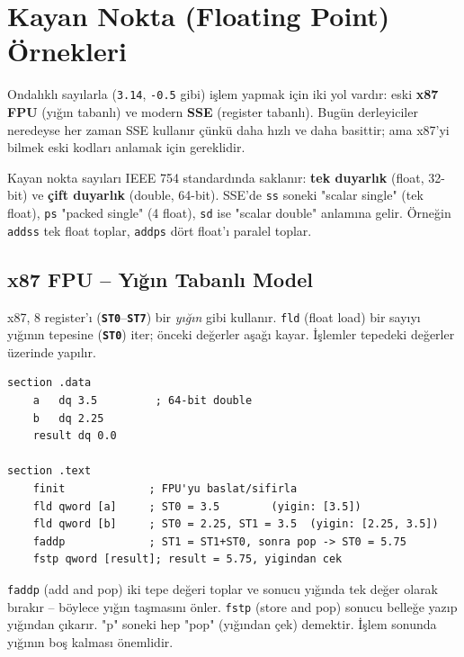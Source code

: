 \documentclass[11pt,a4paper]{article}
\newcommand{\reg}[1]{\texttt{\color{anaMavi}\textbf{#1}}}
\newcommand{\kod}[1]{\texttt{\color{koyuGri}#1}}
\begin{document}
\section{Kayan Nokta (Floating Point) Örnekleri}

Ondalıklı sayılarla (\kod{3.14}, \kod{-0.5} gibi) işlem yapmak için iki yol
vardır: eski \textbf{x87 FPU} (yığın tabanlı) ve modern \textbf{SSE} (register
tabanlı). Bugün derleyiciler neredeyse her zaman SSE kullanır çünkü daha hızlı
ve daha basittir; ama x87'yi bilmek eski kodları anlamak için gereklidir.

\begin{bilgikutu}
Kayan nokta sayıları IEEE 754 standardında saklanır: \textbf{tek duyarlık}
(float, 32-bit) ve \textbf{çift duyarlık} (double, 64-bit). SSE'de \kod{ss}
soneki "scalar single" (tek float), \kod{ps} "packed single" (4 float),
\kod{sd} ise "scalar double" anlamına gelir. Örneğin \kod{addss} tek float
toplar, \kod{addps} dört float'ı paralel toplar.
\end{bilgikutu}

\subsection{x87 FPU -- Yığın Tabanlı Model}

x87, 8 register'ı (\reg{ST0}--\reg{ST7}) bir \emph{yığın} gibi kullanır.
\kod{fld} (float load) bir sayıyı yığının tepesine (\reg{ST0}) iter; önceki
değerler aşağı kayar. İşlemler tepedeki değerler üzerinde yapılır.

\begin{ornekkutu}
\begin{lstlisting}
section .data
    a   dq 3.5         ; 64-bit double
    b   dq 2.25
    result dq 0.0

section .text
    finit             ; FPU'yu baslat/sifirla
    fld qword [a]     ; ST0 = 3.5        (yigin: [3.5])
    fld qword [b]     ; ST0 = 2.25, ST1 = 3.5  (yigin: [2.25, 3.5])
    faddp             ; ST1 = ST1+ST0, sonra pop -> ST0 = 5.75
    fstp qword [result]; result = 5.75, yigindan cek
\end{lstlisting}
\end{ornekkutu}

\begin{notkutu}
\kod{faddp} (add and pop) iki tepe değeri toplar ve sonucu yığında tek değer
olarak bırakır -- böylece yığın taşmasını önler. \kod{fstp} (store and pop)
sonucu belleğe yazıp yığından çıkarır. "p" soneki hep "pop" (yığından çek)
demektir. İşlem sonunda yığının boş kalması önemlidir.
\end{notkutu}
\end{document}
